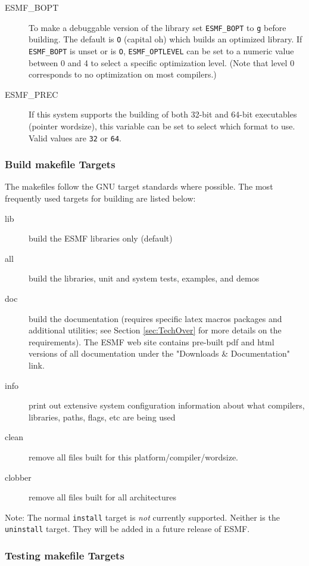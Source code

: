 \begin{description}
\item[ESMF\_BOPT]
To make a debuggable version of the library set {\tt ESMF\_BOPT} to 
{\tt g} before building.  The default is {\tt O} (capital oh) which builds an 
optimized library.
If {\tt ESMF\_BOPT} is unset or is {\tt O}, {\tt ESMF\_OPTLEVEL} can be set 
to a numeric value between 0 and 4 to select a specific optimization level.
(Note that level 0 corresponds to no optimization on most compilers.)

\item[ESMF\_PREC]
If this system supports the building of both 32-bit and 64-bit executables
(pointer wordsize), this variable can be set to select which format to use.
Valid values are {\tt 32} or {\tt 64}.

\end{description}


\subsubsection{Build makefile Targets}

The makefiles follow the GNU target standards where possible.
The most frequently used targets for building are listed below:
\begin{description}
\item[lib] build the ESMF libraries only (default)
\item[all] build the libraries, unit and system tests, examples, and demos
\item[doc] build the documentation (requires specific latex macros packages
and additional utilities; see Section \ref{sec:TechOver} for more details
on the requirements).  The ESMF web site 
contains pre-built pdf and html versions of all documentation
under the "Downloads \& Documentation" link.
\item[info] print out extensive system configuration information about what
           compilers, libraries, paths, flags, etc are being used
\item[clean] remove all files built for this platform/compiler/wordsize.
\item[clobber] remove all files built for all architectures
\end{description}

Note: The normal {\tt install} target is {\it not} currently supported.  
Neither is the {\tt uninstall} target.  
They will be added in a future release of ESMF.



\subsubsection{Testing makefile Targets}

